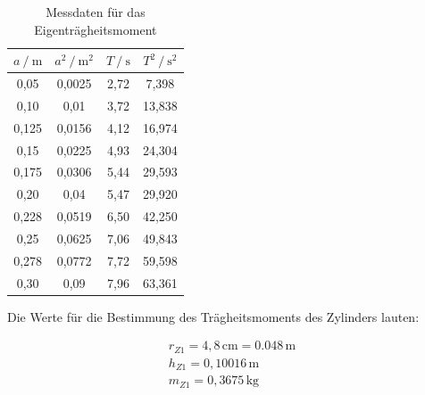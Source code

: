 \begin{table}
    \centering
    \caption{Messdaten für das Eigenträgheitsmoment}
    \label{Tabelle2}
    \begin{tabular} {c  c  c  c}
        \toprule
        {$a  \mathbin{/}  \unit{\meter} $} &
        {$a^{2}  \mathbin{/}  \unit{\meter^{2}}$} &
        {$T  \mathbin{/}  \unit{\second}$} &
        {$T^{2}  \mathbin{/}  \unit{\second}^2$} \\
        \midrule
        \vspace{0.2cm}
        0,05  & 0,0025 & 2,72 &  7,398 \\
        \vspace{0.2cm}
        0,10  & 0,01   & 3,72 & 13,838 \\
        \vspace{0.2cm}
        0,125 & 0,0156 & 4,12 & 16,974 \\
        \vspace{0.2cm}
        0,15  & 0,0225 & 4,93 & 24,304 \\
        \vspace{0.2cm}
        0,175 & 0,0306 & 5,44 & 29,593 \\
        \vspace{0.2cm}
        0,20  & 0,04   & 5,47 & 29,920 \\
        \vspace{0.2cm}
        0,228 & 0,0519 & 6,50 & 42,250 \\
        \vspace{0.2cm}
        0,25  & 0,0625 & 7,06 & 49,843 \\
        \vspace{0.2cm}
        0,278 & 0,0772 & 7,72 & 59,598 \\
        \vspace{0.2cm}
        0,30  & 0,09   & 7,96 & 63,361 \\
        \bottomrule
    \end{tabular} 
\end{table}


\begin{flushleft}
    Die Werte für die Bestimmung des Trägheitsmoments des Zylinders lauten:
\end{flushleft}

\begin{align*}
     r_{Z1} = 4,8\, \unit{\centi\meter} = 0.048\, \unit{\meter} \\
     h_{Z1} = 0,10016\, \unit{\meter}  \\
      m_{Z1} = 0,3675\, \unit{\kilogram}  \\
\end{align*}

